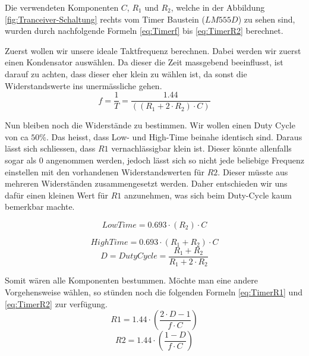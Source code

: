 Die verwendeten Komponenten $C$, $R_{1}$ und $R_{2}$, welche in der Abbildung  \ref{fig:Tranceiver-Schaltung} rechts vom Timer Baustein ($LM555D$) zu sehen sind, wurden durch nachfolgende Formeln \ref{eq:Timerf} bis \ref{eq:TimerR2} berechnet. 


Zuerst wollen wir unsere ideale Taktfrequenz berechnen. Dabei werden wir zuerst einen Kondensator auswählen. Da dieser die Zeit massgebend beeinflusst, ist darauf zu achten, dass dieser eher klein zu wählen ist, da sonst die Widerstandswerte ins unermässliche gehen.
\begin{equation}\label{eq:Timerf}
f= \dfrac{1}{T}= \dfrac{1.44}{((R_{1} + 2 \cdot R_{2})\cdot C)}
\end{equation}

Nun bleiben noch die Widerstände zu bestimmen. Wir wollen einen Duty Cycle von ca $50\%$. Das heisst, dass Low- und High-Time beinahe identisch sind. Daraus lässt sich schliessen, dass $R1$ vernachlässigbar klein ist. Dieser könnte allenfalls sogar als $0$ angenommen werden, jedoch lässt sich so nicht jede beliebige Frequenz einstellen mit den vorhandenen Widerstandswerten für $R2$. Dieser müsste aus mehreren Widerständen zusammengesetzt werden. Daher entschieden wir uns dafür einen kleinen Wert für $R1$ anzunehmen, was sich beim Duty-Cycle kaum bemerkbar machte.


\begin{equation}\label{eq:TimerT}
LowTime= 0.693 \cdot (R_{2}) \cdot C
\end{equation}

\begin{equation}\label{eq:TimerTH}
HighTime= 0.693 \cdot (R_{1} + R_{2}) \cdot C
\end{equation}
\begin{equation}\label{eq:TimerDC}
D = DutyCycle = \dfrac{R_{1} + R_{2}}{R_{1} + 2 \cdot R_{2}}
\end{equation}

Somit wären alle Komponenten bestummen. Möchte man eine andere Vorgehensweise wählen, so stünden noch die folgenden Formeln \ref{eq:TimerR1} und \ref{eq:TimerR2} zur verfügung.
\begin{equation}\label{eq:TimerR1}
R1 = 1.44 \cdot \left( \dfrac{2 \cdot D - 1}{f \cdot C} \right)
\end{equation}
\begin{equation}\label{eq:TimerR2}
R2 = 1.44 \cdot \left( \dfrac{1-D}{f \cdot C} \right)
\end{equation} 


